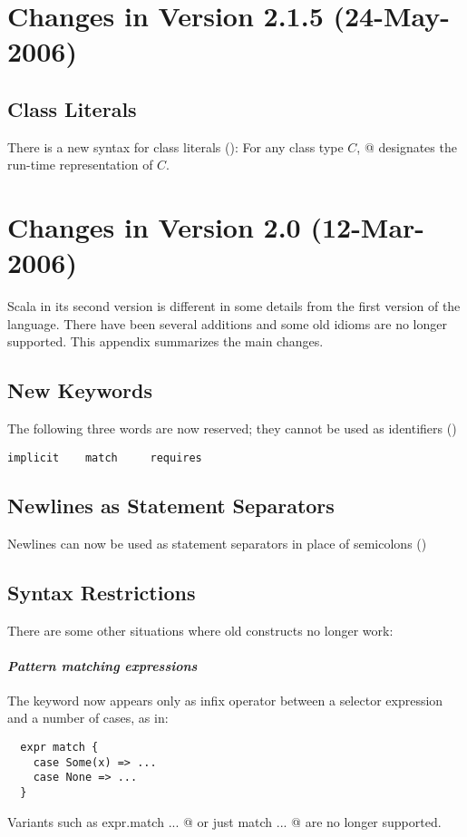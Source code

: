 \section*{Changes in Version 2.1.5 (24-May-2006)}

\subsection*{Class Literals} There is a new syntax for class literals
(): For any class type $C$,
\lstinline@classOf[$C$]@ designates the run-time representation of
$C$.

\section*{Changes in Version 2.0 (12-Mar-2006)}

Scala in its second version is different in some details from the
first version of the language. There have been several additions and
some old idioms are no longer supported. This appendix summarizes
the main changes.

\subsection*{New Keywords}

The following three words are now reserved; they cannot be used as
identifiers ()
\begin{lstlisting}
implicit    match     requires
\end{lstlisting}

\subsection*{Newlines as Statement Separators}

Newlines can now be used as statement separators in place of
semicolons ()

\subsection*{Syntax Restrictions}

There are some other situations where old constructs no longer work:

\paragraph{\em Pattern matching expressions} The \lstinline@match@
keyword now appears only as infix operator between a selector
expression and a number of cases, as in:
\begin{lstlisting}
  expr match {
    case Some(x) => ...
    case None => ...
  }
\end{lstlisting}
Variants such as \lstinline@ expr.match {...} @ 
or just
\lstinline@ match {...} @
are no longer supported.

